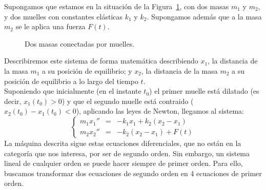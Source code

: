 \begin{ejemplo}
    Supongamos que estamos en la situación de la Figura~\ref{fig:muelles}, con dos masas $m_1$ y $m_2$, y dos muelles con constantes elásticas $k_1$ y $k_2$. Supongamos además que a la masa $m_2$ se le aplica una fuerza $F(t)$.
\begin{figure}[H]
    \centering
    \caption{Dos masas conectadas por muelles.}
    \label{fig:muelles}
\end{figure}
    Describiremos este sistema de forma matemática describiendo $x_1$, la distancia de la masa $m_1$ a su posición de equilibrio; y $x_2$, la distancia de la masa $m_2$ a su posición de equilibrio a lo largo del tiempo $t$.\\

    Suponiendo que inicialmente (en el instante $t_0$) el primer muelle está dilatado (es decir, $x_1(t_0) > 0$) y que el segundo muelle está contraido ($x_2(t_0) - x_1(t_0)<0$), aplicando las leyes de Newton, llegamos al sistema:
    \begin{equation*}
        \left\{\begin{array}{rcl}
                m_1 x_1 '' &=& -k_1 x_1 + k_2 (x_2 - x_1) \\
                m_2 x_2 '' &=& -k_2(x_2 - x_1) + F(t)
        \end{array}\right.
    \end{equation*}
    La máquina descrita sigue estas ecuaciones diferenciales, que no están en la categoría que nos interesa, por ser de segundo orden. Sin embargo, un sistema lineal de cualquier orden se puede hacer siempre de primer orden. Para ello, buscamos transformar dos ecuaciones de segundo orden en 4 ecuaciones de primer orden.\\


\end{ejemplo}
